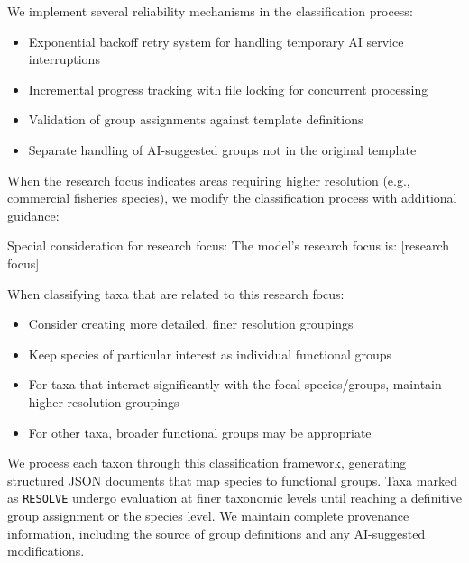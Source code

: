We implement several reliability mechanisms in the classification process:

\begin{itemize}
\item Exponential backoff retry system for handling temporary AI service interruptions
\item Incremental progress tracking with file locking for concurrent processing
\item Validation of group assignments against template definitions
\item Separate handling of AI-suggested groups not in the original template
\end{itemize}

When the research focus indicates areas requiring higher resolution (e.g., commercial fisheries species), we modify the classification process with additional guidance:

\begin{prompt}
Special consideration for research focus:
The model's research focus is: [research focus]

When classifying taxa that are related to this research focus:
\begin{itemize}
\item Consider creating more detailed, finer resolution groupings
\item Keep species of particular interest as individual functional groups
\item For taxa that interact significantly with the focal species/groups, maintain higher resolution groupings
\item For other taxa, broader functional groups may be appropriate
\end{itemize}
\end{prompt}

We process each taxon through this classification framework, generating structured JSON documents that map species to functional groups. Taxa marked as \texttt{RESOLVE} undergo evaluation at finer taxonomic levels until reaching a definitive group assignment or the species level. We maintain complete provenance information, including the source of group definitions and any AI-suggested modifications.
